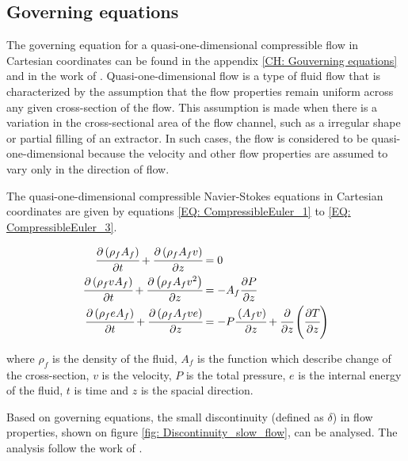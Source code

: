 \documentclass[a4paper,fleqn]{cas-dc}
\begin{document}
\subsection{Governing equations}
The governing equation for a quasi-one-dimensional compressible flow in Cartesian coordinates can be found in the appendix \ref{CH: Gouverning equations} and in the work of \citet{Anderson1995}.  Quasi-one-dimensional flow is a type of fluid flow that is characterized by the assumption that the flow properties remain uniform across any given cross-section of the flow. This assumption is made when there is a variation in the cross-sectional area of the flow channel, such as a irregular shape or partial filling of an extractor. In such cases, the flow is considered to be quasi-one-dimensional because the velocity and other flow properties are assumed to vary only in the direction of flow.

The quasi-one-dimensional compressible Navier-Stokes equations in Cartesian coordinates are given by equations \ref{EQ: CompressibleEuler_1} to \ref{EQ: CompressibleEuler_3}.

{\footnotesize
	\begin{align}
		\label{EQ: CompressibleEuler_1}
		\cfrac{\partial \left( \rho_f A_f \right) }{\partial t} + \cfrac{\partial \left( \rho_f A_f v \right)}{\partial z} &= 0 \\
		\cfrac{\partial \left( \rho_f v A_f \right) }{\partial t} + \cfrac{\partial \left( \rho_f A_f v^2 \right)}{\partial z} &= -A_f \cfrac{\partial P}{\partial z} \label{EQ: CompressibleEuler_2} \\
		\cfrac{\partial \left( \rho_f e A_f \right) }{\partial t} + \cfrac{\partial \left( \rho_f A_f v e\right)}{\partial z} &= -P\cfrac{\left( A_f v \right)}{\partial z} + \cfrac{\partial}{\partial z} \left( \cfrac{\partial T}{\partial z} \right)   
		\label{EQ: CompressibleEuler_3}
	\end{align}  
}

where $\rho_f$ is the density of the fluid, $A_f$ is the function which describe change of the cross-section, $v$ is the velocity, $P$ is the total pressure, $e$ is the internal energy of the fluid, $t$ is time and $z$ is the spacial direction.

Based on governing equations, the small discontinuity (defined as $\delta$) in flow properties, shown on figure \ref{fig: Discontinuity_slow_flow}, can be analysed. The analysis follow the work of \citet{Schreier1982}.
\end{document}
